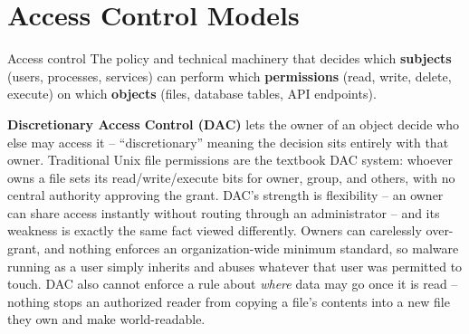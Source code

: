 \section{Access Control Models}

\begin{definition}{Access control}
The policy and technical machinery that decides which \textbf{subjects} (users, processes,
services) can perform which \textbf{permissions} (read, write, delete, execute) on which
\textbf{objects} (files, database tables, API endpoints).
\end{definition}

\textbf{Discretionary Access Control (DAC)} lets the owner of an object decide who else may access
it -- ``discretionary'' meaning the decision sits entirely with that owner. Traditional Unix file
permissions are the textbook DAC system: whoever owns a file sets its read/write/execute bits for
owner, group, and others, with no central authority approving the grant. DAC's strength is
flexibility -- an owner can share access instantly without routing through an administrator -- and
its weakness is exactly the same fact viewed differently. Owners can carelessly over-grant, and
nothing enforces an organization-wide minimum standard, so malware running as a user simply
inherits and abuses whatever that user was permitted to touch. DAC also cannot enforce a rule about
\emph{where} data may go once it is read -- nothing stops an authorized reader from copying a
file's contents into a new file they own and make world-readable.

